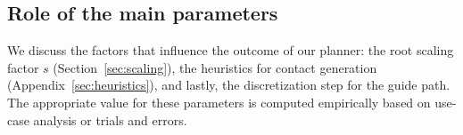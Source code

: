 \documentclass[journal]{IEEEtran}
\providecommand{\DIFdeltex}[1]{} %
\providecommand{\DIFdelbegin}{\protect\cbdelete} %
\providecommand{\DIFdelend}{} %
\providecommand{\DIFdelFL}[1]{\DIFdel{#1}} %
\providecommand{\DIFdel}[1]{\texorpdfstring{\DIFdeltex{#1}}{}} %
\begin{document}
 
\DIFdelbegin %
{%
\DIFdelFL{Contact sequence found for a pen manipulation in a zero gravity environment.}}

\DIFdel{\textbf{Contacts involved:} Three finger-tips.
}%

\DIFdel{\textbf{Heuristics:} $h_{\textrm{\it EFORT}}$ for all fingers.
 }%

\DIFdelend \subsection{Role of the main parameters} \label{sec:influence}
We discuss the factors that influence the outcome of our planner: the root scaling factor $s$ (Section~\ref{sec:scaling}), the heuristics for
contact generation (Appendix~\ref{sec:heuristics}), and lastly, the discretization step for the guide path. The appropriate value for these parameters
is computed empirically based on use-case analysis or trials and errors.
\end{document}
